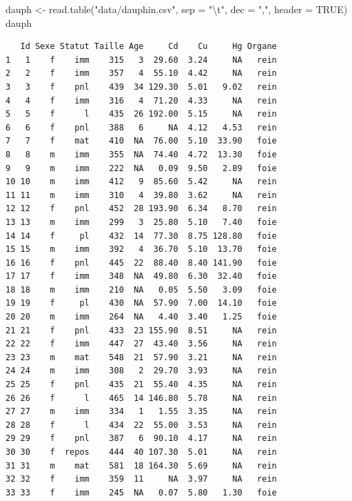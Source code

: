 \documentclass[
  a4paper,
  DIV=11,
  numbers=noendperiod,
  oneside]{scrreprt}
\newenvironment{Shaded}{}{}
\newcommand{\AttributeTok}[1]{\textcolor[rgb]{0.84,0.23,0.29}{#1}}
\newcommand{\ConstantTok}[1]{\textcolor[rgb]{0.00,0.36,0.77}{#1}}
\newcommand{\FunctionTok}[1]{\textcolor[rgb]{0.44,0.26,0.76}{#1}}
\newcommand{\NormalTok}[1]{\textcolor[rgb]{0.14,0.16,0.18}{#1}}
\newcommand{\OtherTok}[1]{\textcolor[rgb]{0.44,0.26,0.76}{#1}}
\newcommand{\SpecialCharTok}[1]{\textcolor[rgb]{0.00,0.36,0.77}{#1}}
\newcommand{\StringTok}[1]{\textcolor[rgb]{0.01,0.18,0.38}{#1}}
\begin{document}
\begin{Shaded}
\begin{Highlighting}[]
\NormalTok{dauph }\OtherTok{\textless{}{-}} \FunctionTok{read.table}\NormalTok{(}\StringTok{"data/dauphin.csv"}\NormalTok{,}
                    \AttributeTok{sep =} \StringTok{"}\SpecialCharTok{\textbackslash{}t}\StringTok{"}\NormalTok{,}
                    \AttributeTok{dec =} \StringTok{","}\NormalTok{,}
                    \AttributeTok{header =} \ConstantTok{TRUE}\NormalTok{)}
\NormalTok{dauph}
\end{Highlighting}
\end{Shaded}

\begin{verbatim}
   Id Sexe Statut Taille Age     Cd    Cu     Hg Organe
1   1    f    imm    315   3  29.60  3.24     NA   rein
2   2    f    imm    357   4  55.10  4.42     NA   rein
3   3    f    pnl    439  34 129.30  5.01   9.02   rein
4   4    f    imm    316   4  71.20  4.33     NA   rein
5   5    f      l    435  26 192.00  5.15     NA   rein
6   6    f    pnl    388   6     NA  4.12   4.53   rein
7   7    f    mat    410  NA  76.00  5.10  33.90   foie
8   8    m    imm    355  NA  74.40  4.72  13.30   foie
9   9    m    imm    222  NA   0.09  9.50   2.89   foie
10 10    m    imm    412   9  85.60  5.42     NA   rein
11 11    m    imm    310   4  39.80  3.62     NA   rein
12 12    f    pnl    452  28 193.90  6.34   8.70   rein
13 13    m    imm    299   3  25.80  5.10   7.40   foie
14 14    f     pl    432  14  77.30  8.75 128.80   foie
15 15    m    imm    392   4  36.70  5.10  13.70   foie
16 16    f    pnl    445  22  88.40  8.40 141.90   foie
17 17    f    imm    348  NA  49.80  6.30  32.40   foie
18 18    m    imm    210  NA   0.05  5.50   3.09   foie
19 19    f     pl    430  NA  57.90  7.00  14.10   foie
20 20    m    imm    264  NA   4.40  3.40   1.25   foie
21 21    f    pnl    433  23 155.90  8.51     NA   rein
22 22    f    imm    447  27  43.40  3.56     NA   rein
23 23    m    mat    548  21  57.90  3.21     NA   rein
24 24    m    imm    308   2  29.70  3.93     NA   rein
25 25    f    pnl    435  21  55.40  4.35     NA   rein
26 26    f      l    465  14 146.80  5.78     NA   rein
27 27    m    imm    334   1   1.55  3.35     NA   rein
28 28    f      l    434  22  55.00  3.53     NA   rein
29 29    f    pnl    387   6  90.10  4.17     NA   rein
30 30    f  repos    444  40 107.30  5.01     NA   rein
31 31    m    mat    581  18 164.30  5.69     NA   rein
32 32    f    imm    359  11     NA  3.97     NA   rein
33 33    f    imm    245  NA   0.07  5.80   1.30   foie

\end{verbatim}
\end{document}

